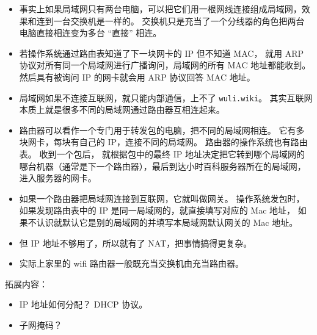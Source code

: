 \begin{itemize}
\item 事实上如果局域网只有两台电脑，可以把它们用一根网线连接组成局域网，效果和连到一台交换机是一样的。 交换机只是充当了一个分线器的角色把两台电脑直接相连变为多台 “直接” 相连。
\item 若操作系统通过路由表知道了下一块网卡的 IP 但不知道 MAC， 就用 ARP 协议对所有同一个局域网进行广播询问，局域网的所有 MAC 地址都能收到。 然后具有被询问 IP 的网卡就会用 ARP 协议回答 MAC 地址。
\item 局域网如果不连接互联网，就只能内部通信，上不了 \verb`wuli.wiki`。 其实互联网本质上就是很多不同的局域网通过路由器互相连起来。
\item 路由器可以看作一个专门用于转发包的电脑，把不同的局域网相连。 它有多块网卡，每块有自己的 IP，连接不同的局域网。 路由器的操作系统也有路由表。 收到一个包后， 就根据包中的最终 IP 地址决定把它转到哪个局域网的哪台机器（通常是下一个路由器），最后到达小时百科服务器所在的局域网， 进入服务器的网卡。
\item 如果一个路由器把局域网连接到互联网，它就叫做网关。 操作系统发包时，如果发现路由表中的 IP 是同一局域网的，就直接填写对应的 Mac 地址， 如果不认识就默认它是别的局域网的并填写本局域网默认网关的 Mac 地址。
\item 但 IP 地址不够用了，所以就有了 NAT，把事情搞得更复杂。
\item 实际上家里的 wifi 路由器一般既充当交换机由充当路由器。
\end{itemize}
拓展内容：
\begin{itemize}
\item IP 地址如何分配？ DHCP 协议。
\item 子网掩码？
\end{itemize}

